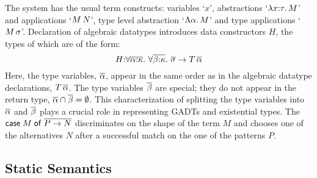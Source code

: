 \documentclass[screen,nonacm,manuscript,review]{acmart} %
\begin{document}
The system has the usual term constructs: variables `$x$',
abstractions `$\lambda x{:}\tau.\, M$' and applications `$M \, N$',
type level abstraction `$\Lambda \alpha.\, M$' and type applications
`$M\,\sigma$'. Declaration of algebraic datatypes introduces data
constructors $H$, the types of which are of the form:
\[
H {:} \forall\overline{\alpha{:}\kappa}.~\forall\overline{\beta{:}\kappa}.~\overline{\sigma} \to T\,\overline{\alpha}
\]
Here, the type variables, $\overline{\alpha}$, appear in the same order as in
the algebraic datatype declarations, $T\,\overline{\alpha}$.
The type variables $\overline{\beta}$ are special; they
do not appear in the return type, $\overline{\alpha} \cap \overline{\beta} = \emptyset$.
This characterization of splitting the type variables into $\overline{\alpha}$
and $\overline{\beta}$ plays a crucial role in representing GADTs and
existential types.
The $\mathsf{case}\;M\;\mathsf{of}\;\overline{P \to N}$
discriminates on the shape of the term $M$ and chooses one of the
alternatives $N$ after a successful match on the one of the patterns
$P$.

\subsection{Static Semantics}\label{sec:sfc-static-sem}

\newcommand\KReflCo{
 \ib{\irule[\trule{co-refl}]
 {\TyKinding \TEnv \tau \kappa};
 {\CoKinding \TEnv {\Refl \tau} {\tau \sim \tau}}
 }
}

\newcommand\KSymCo{
 \ib{\irule[\trule{co-sym}]
 {\CoKinding \TEnv \Co {\tau \sim \sigma}};
 {\CoKinding \TEnv {\Sym \Co} {\sigma \sim \tau}}
 }
}

\newcommand\KTransCo{
 \ib{\irule[\trule{co-trans}]
 {\CoKinding\TEnv {\Co_1} {\tau \sim \tau_2}}
 {\CoKinding\TEnv {\Co_2} {\tau_2 \sim \sigma}};
 {\CoKinding\TEnv {\Trans {\Co_1} \Co_2} {\tau \sim \sigma}}
 }
}

\newcommand\KInstCo{
 \ib{\irule[\trule{co-$\E\forall$}]
 {\CoKinding\TEnv \Co {\Forall\TyVar\tau_1 \sim \Forall\beta\tau_2}}
 {\Subst_1 = \Sub\TyVar\sigma}{\Subst_2 = \Sub\beta\sigma};
 {\CoKinding\TEnv {\Co\At\sigma} {\Subst_1\tau_1 \sim \Subst_2\tau_2}}
 }
}

\newcommand\KForallCo{
 \ib{\irule[\trule{co-$\I\forall$}]
 {\CoKinding {\TEnv,\TyVar\co\kappa} \Co {\tau_1 \sim \tau_2}}{\fresh\alpha\TEnv};
 {\CoKinding \TEnv {\Forall {\TyVar\co\kappa} \Co} {\Forall {\TyVar\co\kappa}\tau_1 \sim \Forall {\TyVar\co\kappa}\tau_2}}
 }
}

\newcommand\KCoComp{
 \ib{\irule[\trule{co-comp}]
 {\CoKinding \TEnv {\Co_1} {\tau_1 \sim \tau_2}}
 {\CoKinding \TEnv {\Co_2} {\sigma_1 \sim \sigma_2}}
 {\TyKinding \TEnv {\tau_i\App \sigma_i} \kappa};
 {\CoKinding \TEnv {\Co_1\App \Co_2} {\tau_1\App \sigma_1 \sim \tau_2\App \sigma_2}}
 }
}
\end{document}
